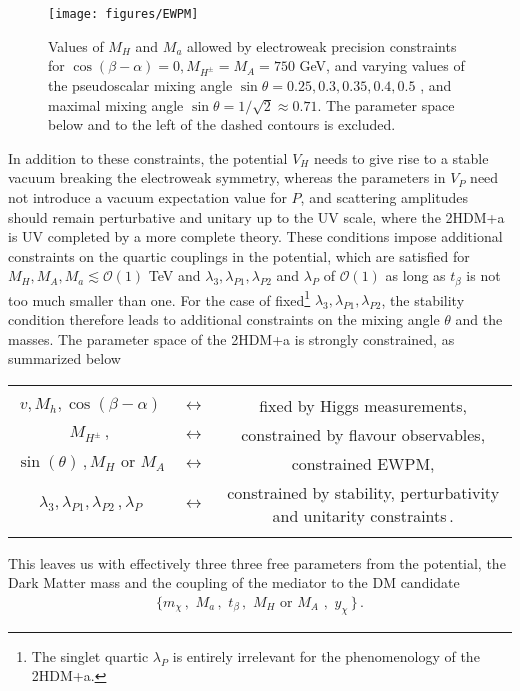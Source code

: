 \documentclass[12pt]{article}
\renewcommand\({\left(}
\renewcommand\){\right)}
\renewcommand\[{\left[}
\renewcommand\]{\right]}
\begin{document}
\begin{figure}
\centering
\texttt{[image: figures/EWPM]}
\caption{\label{fig:EWPM}Values of $M_H$ and $M_a$ allowed by electroweak precision constraints for $\cos(\beta-\alpha)=0, M_{H^\pm}=M_A=750$ GeV, and varying values of the pseudoscalar mixing angle $\sin \theta =0.25, 0.3, 0.35, 0.4, 0.5$ , and maximal mixing angle $\sin\theta =1/\sqrt{2}\approx 0.71$. The parameter space below and to the left of the dashed contours is excluded. }
\end{figure}
In addition to these constraints, the potential $V_H$ needs to give rise to a stable vacuum breaking the electroweak symmetry, whereas the parameters in $V_P$ need not introduce a vacuum expectation value for $P$, and scattering amplitudes should remain perturbative \cite{Gunion:2002zf,Barroso:2013awa} and unitary \cite{Kanemura:1993hm,Akeroyd:2000wc,Ginzburg:2005dt,Grinstein:2015rtl} up to the UV scale, where the 2HDM+a is UV completed by a more complete theory.  These conditions impose additional constraints on the quartic couplings in the potential, which are satisfied for $M_H, M_A, M_a \lesssim \mathcal{O}(1)$ TeV and $\lambda_3, \lambda_{P1}, \lambda_{P2}$ and $\lambda_P$ of $\mathcal{O}(1)$ as long as $t_\beta$ is not too much smaller than one. For the case of fixed\footnote{The singlet quartic $\lambda_P$ is entirely irrelevant for the phenomenology of the 2HDM+a.} $\lambda_3, \lambda_{P1}, \lambda_{P2}$, the stability condition therefore leads to additional constraints on the mixing angle $\theta$ and the masses. The parameter space of the 2HDM+a is strongly constrained, as summarized below
%
\newline
\begin{tabular}{cc c}
&&\\
$v, M_h, \cos(\beta-\alpha) $&$\longleftrightarrow$& fixed by Higgs measurements,\\[.3cm]
$M_{H^\pm}\,, $  &$\longleftrightarrow $& constrained by flavour observables,\\[.3cm]
$\sin(\theta)\,, M_H \,\,\text{or} \,\,M_A$  &$\longleftrightarrow $& constrained EWPM,\\[.3cm]
$\lambda_3, \lambda_{P1}, \lambda_{P2}\,,\lambda_P $ &$\longleftrightarrow $& constrained by stability, perturbativity and unitarity constraints\,.\\[.3cm]
&&
\end{tabular}
\newline
%
This leaves us with effectively three three free parameters from the potential, the Dark Matter mass and the coupling of the mediator to the DM candidate
\begin{align}
\big\{ m_\chi\,,\,\,M_a\,,\,\, t_\beta\,, \,\, M_H\,\,\text{or}\,\,M_A\,\,, \,\, y_\chi\,\big\}\,.
\end{align}
\end{document}
